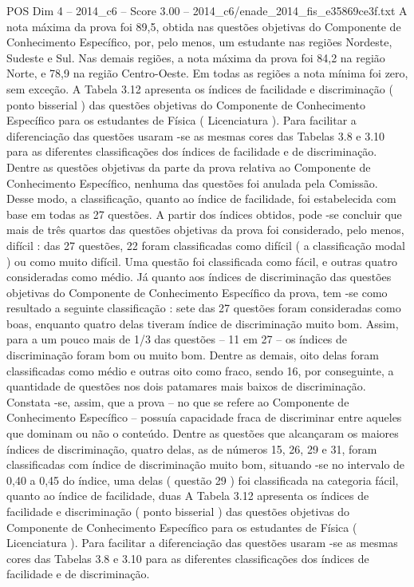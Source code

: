 \begin{textsample}{POS Dim 4 – 2014\_c6 – Score 3.00 – 2014\_c6/enade\_2014\_fis\_e35869ce3f.txt}
A nota máxima da prova foi 89,5, obtida nas questões objetivas do Componente de Conhecimento Específico, por, pelo menos, um estudante nas regiões Nordeste, Sudeste e Sul.
Nas demais regiões, a nota máxima da prova foi 84,2 na região Norte, e 78,9 na região Centro-Oeste.
Em todas as regiões a nota mínima foi zero, sem exceção.
A Tabela 3.12 apresenta os índices de facilidade e discriminação ( ponto bisserial ) das questões objetivas do Componente de Conhecimento Específico para os estudantes de Física ( Licenciatura ).
Para facilitar a diferenciação das questões usaram -se as mesmas cores das Tabelas 3.8 e 3.10 para as diferentes classificações dos índices de facilidade e de discriminação.
Dentre as questões objetivas da parte da prova relativa ao Componente de Conhecimento Específico, nenhuma das questões foi anulada pela Comissão.
Desse modo, a classificação, quanto ao índice de facilidade, foi estabelecida com base em todas as 27 questões.
A partir dos índices obtidos, pode -se concluir que mais de três quartos das questões objetivas da prova foi considerado, pelo menos, difícil : das 27 questões, 22 foram classificadas como difícil ( a classificação modal ) ou como muito difícil.
Uma questão foi classificada como fácil, e outras quatro consideradas como médio.
Já quanto aos índices de discriminação das questões objetivas do Componente de Conhecimento Específico da prova, tem -se como resultado a seguinte classificação : sete das 27 questões foram consideradas como boas, enquanto quatro delas tiveram índice de discriminação muito bom.
Assim, para a um pouco mais de 1/3 das questões – 11 em 27 – os índices de discriminação foram bom ou muito bom.
Dentre as demais, oito delas foram classificadas como médio e outras oito como fraco, sendo 16, por conseguinte, a quantidade de questões nos dois patamares mais baixos de discriminação.
Constata -se, assim, que a prova – no que se refere ao Componente de Conhecimento Específico – possuía capacidade fraca de discriminar entre aqueles que dominam ou não o conteúdo.
Dentre as questões que alcançaram os maiores índices de discriminação, quatro delas, as de números 15, 26, 29 e 31, foram classificadas com índice de discriminação muito bom, situando -se no intervalo de 0,40 a 0,45 do índice, uma delas ( questão 29 ) foi classificada na categoria fácil, quanto ao índice de facilidade, duas A Tabela 3.12 apresenta os índices de facilidade e discriminação ( ponto bisserial ) das questões objetivas do Componente de Conhecimento Específico para os estudantes de Física ( Licenciatura ).
Para facilitar a diferenciação das questões usaram -se as mesmas cores das Tabelas 3.8 e 3.10 para as diferentes classificações dos índices de facilidade e de discriminação.

\end{textsample}
